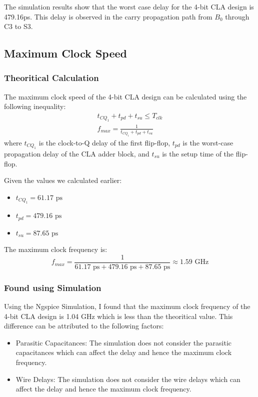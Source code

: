 \documentclass[conference]{IEEEtran}
\begin{document}
The simulation results show that the worst case delay for the 4-bit CLA design is 479.16ps. This delay is observed in the carry propagation path from $B_0$ through C3 to S3.

\subsection{Maximum Clock Speed}

\subsubsection{Theoritical Calculation}
The maximum clock speed of the 4-bit CLA design can be calculated using the following inequality:
    \begin{align}
        t_{CQ_1} + t_{pd} + t_{su} \leq T_{clk} \\
        f_{max} = \frac{1}{t_{CQ_1} + t_{pd} + t_{su}}
    \end{align}
    where $t_{CQ_1}$ is the clock-to-Q delay of the first flip-flop, $t_{pd}$ is the worst-case propagation delay of the CLA adder block, and $t_{su}$ is the setup time of the flip-flop.

    Given the values we calculated earlier:
    \begin{itemize}
        \item $t_{CQ_1} = 61.17 \text{ ps}$
        \item $t_{pd} = 479.16 \text{ ps}$
        \item $t_{su} = 87.65 \text{ ps}$
    \end{itemize}

    The maximum clock frequency is:
    \begin{equation}
        f_{max} = \frac{1}{61.17 \text{ ps} + 479.16 \text{ ps} + 87.65 \text{ ps}} \approx 1.59 \text{ GHz}
    \end{equation}

\subsubsection{Found using Simulation}
Using the Ngspice Simulation, I found that the maximum clock frequency of the 4-bit CLA design is 1.04 GHz which is less than the theoritical value. This difference can be attributed to the following factors:
\begin{itemize}
    \item Parasitic Capacitances: The simulation does not consider the parasitic capacitances which can affect the delay and hence the maximum clock frequency.
    \item Wire Delays: The simulation does not consider the wire delays which can affect the delay and hence the maximum clock frequency.
\end{itemize}
\end{document}
